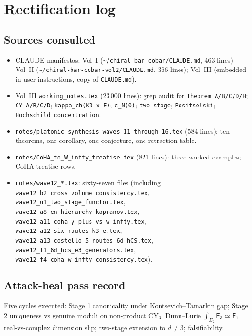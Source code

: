 \documentclass[11pt]{article}
\theoremstyle{definition}
\theoremstyle{remark}
\providecommand{\Eone}{\mathsf{E}_1}
\providecommand{\Ethree}{\mathsf{E}_3}
\begin{document}
\appendix
\section{Rectification log}

\subsection{Sources consulted}

\begin{itemize}[leftmargin=1.5em]
\item CLAUDE manifestos: Vol~I
(\texttt{\textasciitilde/chiral-bar-cobar/CLAUDE.md}, 463 lines);
Vol~II (\texttt{\textasciitilde/chiral-bar-cobar-vol2/CLAUDE.md},
366 lines); Vol~III (embedded in user instructions, copy of
\texttt{CLAUDE.md}).
\item Vol~III \texttt{working\_notes.tex} (23\,000 lines): grep
audit for \texttt{Theorem A/B/C/D/H}; \texttt{CY-A/B/C/D};
\texttt{kappa\_ch(K3 x E)}; \texttt{c\_N(0)};
\texttt{two-stage}; \texttt{Positselski};
\texttt{Hochschild concentration}.
\item \texttt{notes/platonic\_synthesis\_waves\_11\_through\_16.tex}
(584 lines): ten theorems, one corollary, one conjecture, one
retraction table.
\item \texttt{notes/CoHA\_to\_W\_infty\_treatise.tex} (821 lines):
three worked examples; CoHA treatise rows.
\item \texttt{notes/wave12\_*.tex}: sixty-seven files (including
\texttt{wave12\_b2\_cross\_volume\_consistency.tex},
\texttt{wave12\_u1\_two\_stage\_functor.tex},
\texttt{wave12\_a8\_en\_hierarchy\_kapranov.tex},
\texttt{wave12\_a11\_coha\_y\_plus\_vs\_w\_infty.tex},
\texttt{wave12\_a12\_six\_routes\_k3\_e.tex},
\texttt{wave12\_a13\_costello\_5\_routes\_6d\_hCS.tex},
\texttt{wave12\_f1\_6d\_hcs\_e3\_generators.tex},
\texttt{wave12\_f4\_coha\_w\_infty\_consistency.tex}).
\end{itemize}

\subsection{Attack-heal pass record}

Five cycles executed: Stage 1 canonicality under Kontsevich--Tamarkin
gap; Stage 2 uniqueness vs genuine moduli on non-product CY$_3$;
Dunn--Lurie $\int_{\Sigma_2}\Ethree\simeq\Eone$ real-vs-complex
dimension slip; two-stage extension to $d\neq 3$; falsifiability.
\end{document}
